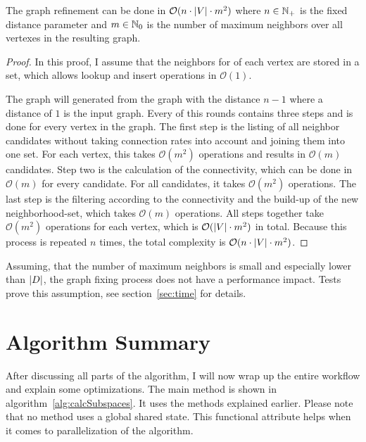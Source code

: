 \begin{envtheo}
	The graph refinement can be done in $\mathcal{O} ( n \cdot \left|V\right| \cdot m^2 )$ where $n \in \mathbb{N}_+$ is the fixed distance parameter and $m \in \mathbb{N}_0$ is the number of maximum neighbors over all vertexes in the resulting graph.
\end{envtheo}
\begin{proof}
	In this proof, I assume that the neighbors for of each vertex are stored in a set, which allows lookup and insert operations in $\mathcal{O} (1)$.

	The graph will generated from the graph with the distance $n-1$ where a distance of $1$ is the input graph. Every of this rounds contains three steps and is done for every vertex in the graph. The first step is the listing of all neighbor candidates without taking connection rates into account and joining them into one set. For each vertex, this takes $\mathcal{O} ( m^2 )$ operations and results in $\mathcal{O} ( m )$ candidates. Step two is the calculation of the connectivity, which can be done in $\mathcal{O} ( m )$ for every candidate. For all candidates, it takes $\mathcal{O} ( m^2 )$ operations. The last step is the filtering according to the connectivity and the build-up of the new neighborhood-set, which takes $\mathcal{O} ( m )$ operations. All steps together take $\mathcal{O} ( m^2 )$ operations for each vertex, which is $\mathcal{O} ( \left|V\right| \cdot m^2)$ in total. Because this process is repeated $n$ times, the total complexity is $\mathcal{O} ( n \cdot \left|V\right| \cdot m^2 )$.
\end{proof}

Assuming, that the number of maximum neighbors is small and especially lower than $\left|D\right|$, the graph fixing process does not have a performance impact. Tests prove this assumption, see section~\ref{sec:time} for details.

\section{Algorithm Summary}
After discussing all parts of the algorithm, I will now wrap up the entire workflow and explain some optimizations. The main method is shown in algorithm~\ref{alg:calcSubspaces}. It uses the methods explained earlier. Please note that no method uses a global shared state. This functional attribute helps when it comes to parallelization of the algorithm.

